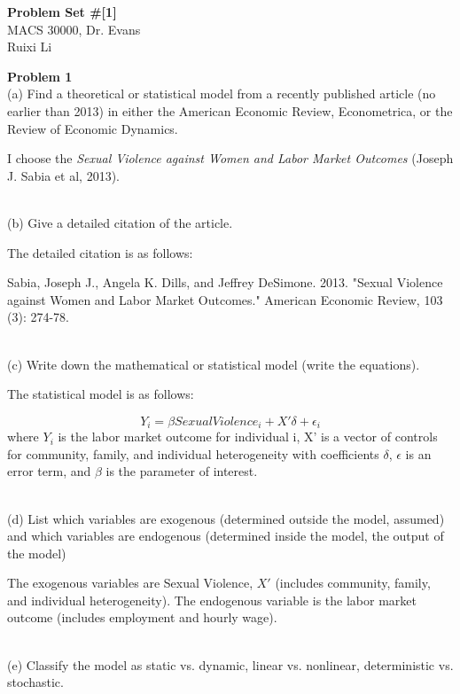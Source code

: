 \documentclass[letterpaper,12pt]{article}
\theoremstyle{definition}
\begin{document}
\begin{flushleft}
  \textbf{\large{Problem Set \#[1]}} \\
  MACS 30000, Dr. Evans \\
  Ruixi Li
\end{flushleft}

\vspace{5mm}

\noindent\textbf{Problem 1}
\textbf \\
{(a)} Find a theoretical or statistical model from a recently published article (no earlier than 2013) in either the American Economic Review, Econometrica, or the Review of Economic Dynamics.

I choose the \emph{Sexual Violence against Women and Labor Market Outcomes} (Joseph J. Sabia et al, 2013).

\textbf \\
{(b)} Give a detailed citation of the article.

The detailed citation is as follows:

Sabia, Joseph J., Angela K. Dills, and Jeffrey DeSimone. 2013. "Sexual Violence against Women and Labor Market Outcomes." American Economic Review, 103 (3): 274-78.

\textbf \\
{(c)} Write down the mathematical or statistical model (write the equations).

The statistical model is as follows:

\begin{equation}\label{EqCoolness}
Y_{i} = \beta Sexual Violence_{i} + X' \delta + \epsilon_{i}
\end{equation}
where $Y_{i}$ is the labor market outcome for individual i, X' is a vector of controls for community, family, and individual heterogeneity with coefficients $\delta$, $\epsilon$ is an error term, and $\beta$ is the parameter of interest.

\textbf \\
{(d)} List which variables are exogenous (determined outside the model, assumed) and which variables are endogenous (determined inside the model, the output of the model)

The exogenous variables are Sexual Violence, $X'$ (includes community, family, and individual heterogeneity). The endogenous variable is the labor market outcome (includes employment and hourly wage).

\textbf \\
{(e)} Classify the model as static vs. dynamic, linear vs. nonlinear, deterministic vs. stochastic.
\end{document}
